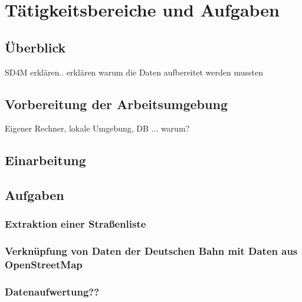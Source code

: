 \chapter{Tätigkeitsbereiche und Aufgaben}
\label{sec:main}
\section{Überblick}
\label{sec:main:overview}
SD4M erklären.. erklären warum die Daten aufbereitet werden mussten
\section{Vorbereitung der Arbeitsumgebung}
\label{sec:main:preparation}
Eigener Rechner, lokale Umgebung, DB ... warum?
\section{Einarbeitung}
\section{Aufgaben}
\subsection{Extraktion einer Straßenliste}
\subsection{Verknüpfung von Daten der Deutschen Bahn mit Daten aus OpenStreetMap}
\subsection{Datenaufwertung??}
